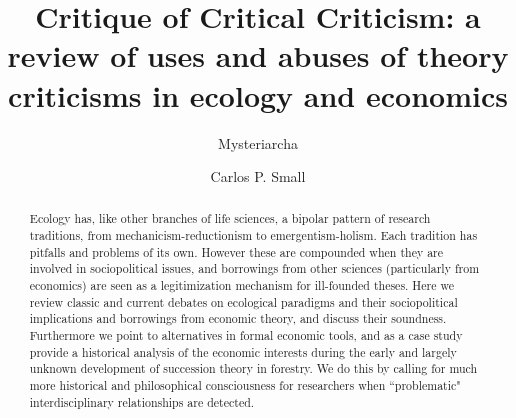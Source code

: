 \documentclass[a4paper, 9pt]{article}
\title{Critique of Critical Criticism: a review of uses and abuses of theory criticisms in ecology and economics}
\author[1]{Mysteriarcha}
\author[1]{Carlos P. Small}
\affil[1]{Vienna Circle Club}
\begin{document}
		
	\maketitle
	
	\begin{abstract}
		Ecology has, like other branches of life sciences, a bipolar pattern of research traditions, from mechanicism-reductionism to emergentism-holism. Each tradition has pitfalls and problems of its own. However these are compounded when they are involved in sociopolitical issues, and borrowings from other sciences (particularly from economics) are seen as a legitimization mechanism for ill-founded theses. Here we review classic and current debates on ecological paradigms and their sociopolitical implications and borrowings from economic theory, and discuss their soundness. Furthermore we point to alternatives in formal economic tools, and as a case study provide a historical analysis of the economic interests during the early and largely unknown development of succession theory in forestry. We do this by calling for much more historical and philosophical consciousness for researchers when ``problematic" interdisciplinary relationships are detected. 
	\end{abstract}
	
	
	
\end{document}
